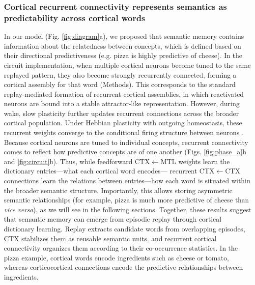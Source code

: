 \documentclass{article}
\begin{document}
\subsubsection*{Cortical recurrent connectivity represents semantics as predictability across cortical words}
In our model (Fig. \ref{fig:diagram}a), we proposed that semantic memory contains information about the relatedness between concepts, which is defined based on their directional predictiveness (e.g. pizza is highly predictive of cheese). In the circuit implementation, when multiple cortical neurons become tuned to the same replayed pattern, they also become strongly recurrently connected, forming a cortical assembly for that word (Methods). This corresponds to the standard replay-mediated formation of recurrent cortical assemblies, in which reactivated neurons are bound into a stable attractor-like representation. However, during wake, slow plasticity further updates recurrent connections across the broader cortical population. Under Hebbian plasticity with outgoing homeostasis, these recurrent weights converge to the conditional firing structure between neurons \cite{albesagonzalez_2025}. Because cortical neurons are tuned to individual concepts, recurrent connectivity comes to reflect how predictive concepts are of one another (Figs. \ref{fig:phase_a}h and \ref{fig:circuit}b). Thus, while feedforward CTX$\leftarrow$MTL weights learn the dictionary entries---what each cortical word encodes--- recurrent CTX$\leftarrow$CTX connections learn the relations between entries---how each word is situated within the broader semantic structure. Importantly, this allows storing asymmetric semantic relationships (for example, pizza is much more predictive of cheese than \textit{vice versa}), as we will see in the following sections.
\newline\newline
Together, these results suggest that semantic memory can emerge from episodic replay through cortical dictionary learning. Replay extracts candidate words from overlapping episodes, CTX stabilizes them as reusable semantic units, and recurrent cortical connectivity organizes them according to their co-occurrence statistics. In the pizza example, cortical words encode ingredients such as cheese or tomato, whereas corticocortical connections encode the predictive relationships between ingredients.
\end{document}
